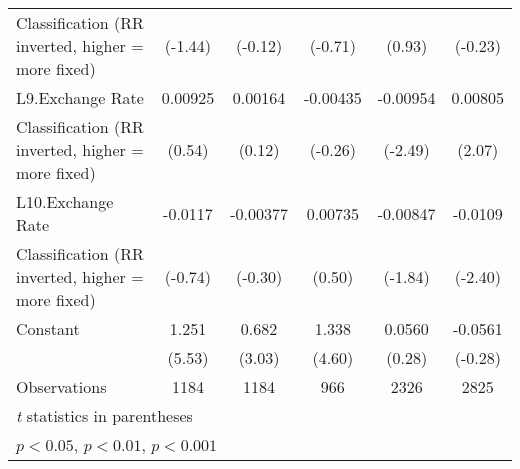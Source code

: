 {\begin{tabular}{l*{5}{c}}
Classification (RR inverted, higher = more fixed)&     (-1.44)         &     (-0.12)         &     (-0.71)         &      (0.93)         &     (-0.23)         \\
[1em]
L9.Exchange Rate    &     0.00925         &     0.00164         &    -0.00435         &    -0.00954\sym{*}  &     0.00805\sym{*}  \\
Classification (RR inverted, higher = more fixed)&      (0.54)         &      (0.12)         &     (-0.26)         &     (-2.49)         &      (2.07)         \\
[1em]
L10.Exchange Rate   &     -0.0117         &    -0.00377         &     0.00735         &    -0.00847         &     -0.0109\sym{*}  \\
Classification (RR inverted, higher = more fixed)&     (-0.74)         &     (-0.30)         &      (0.50)         &     (-1.84)         &     (-2.40)         \\
[1em]
Constant            &       1.251\sym{***}&       0.682\sym{**} &       1.338\sym{***}&      0.0560         &     -0.0561         \\
                    &      (5.53)         &      (3.03)         &      (4.60)         &      (0.28)         &     (-0.28)         \\
\hline
Observations        &        1184         &        1184         &         966         &        2326         &        2825         \\
\hline\hline
\multicolumn{6}{l}{\footnotesize \textit{t} statistics in parentheses}\\
\multicolumn{6}{l}{\footnotesize \sym{*} \(p<0.05\), \sym{**} \(p<0.01\), \sym{***} \(p<0.001\)}\\
\end{tabular}
}
